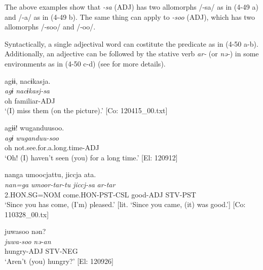 The above examples show that \textit{{}-sa} (ADJ) has two allomorphs /-sa/ as in (4-49 a) and /-a/ as in (4-49 b). The same thing can apply to \textit{{}-soo} (ADJ), which has two allomorphs /-soo/ and /-oo/.

Syntactically, a single adjectival word can costitute the predicate as in (4-50 a-b). Additionally, an adjective can be followed by the stative verb \textit{ar-} (or \textit{nə-}) in some environments as in (4-50 c-d) (see  for more details).

\ea  \label{ex:4.50}
\ea  \label{ex:4.50a}%
\glll    agɨɨ,  nacɨkasja.\\
      \textit{agɨ}  \textit{nacɨkasj-sa}\\
      oh  familiar-ADJ\\
      \glt       ‘(I) miss them (on the picture).’ [Co: 120415\_00.txt]

\ex\label{ex:4.50b}%
\glll    agɨɨ!  wuganduusoo.\\
      \textit{agɨ}  \textit{wuganduu-soo}\\
      oh  not.see.for.a.long.time-ADJ\\
      \glt       ‘Oh! (I) haven’t seen (you) for a long time.’ [El: 120912]

\ex\label{ex:4.50c}%
\glll    nanga  umoocjattu,  jiccja  ata.\\
      \textit{nan=ga}  \textit{umoor-tar-tu}  \textit{jiccj-sa}  \textit{ar-tar}\\
      2.HON.SG=NOM  come.HON-PST-CSL  good-ADJ  STV-PST\\
      \glt       ‘Since you has come, (I’m) pleased.’ [lit. ‘Since you came, (it) was good.’] [Co: 110328\_00.tx]

\ex\label{ex:4.50d}%
\glll    juwasoo  nən?\\
      \textit{juwa-soo}  \textit{nə-an}\\
      hungry-ADJ  STV-NEG\\
      \glt       ‘Aren’t (you) hungry?’ [El: 120926]
    \z
\z

